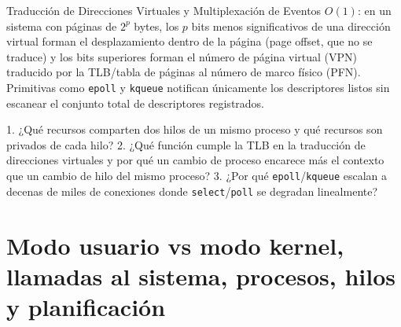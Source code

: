 \documentclass{book}
\begin{document}
\begin{tcolorbox}[title={Definición}, studiumdef, breakable]

Traducción de Direcciones Virtuales y Multiplexación de Eventos \(O(1)\): en un sistema con páginas de \(2^p\) bytes, los \(p\) bits menos significativos de una dirección virtual forman el desplazamiento dentro de la página (page offset, que no se traduce) y los bits superiores forman el número de página virtual (VPN) traducido por la TLB/tabla de páginas al número de marco físico (PFN). Primitivas como \texttt{epoll} y \texttt{kqueue} notifican únicamente los descriptores listos sin escanear el conjunto total de descriptores registrados.
\end{tcolorbox}

\begin{tcolorbox}[title={Autoficha}, studiumcheck, breakable]

1. ¿Qué recursos comparten dos hilos de un mismo proceso y qué recursos son privados de cada hilo? 2. ¿Qué función cumple la TLB en la traducción de direcciones virtuales y por qué un cambio de proceso encarece más el contexto que un cambio de hilo del mismo proceso? 3. ¿Por qué \texttt{epoll}/\texttt{kqueue} escalan a decenas de miles de conexiones donde \texttt{select}/\texttt{poll} se degradan linealmente?
\end{tcolorbox}

\section{Modo usuario vs modo kernel, llamadas al sistema, procesos, hilos y planificación}
\end{document}
